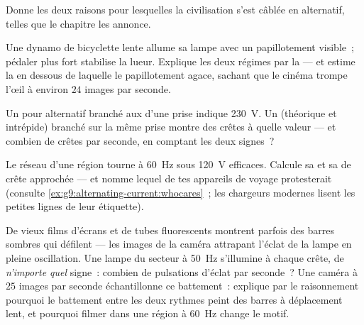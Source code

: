 \begin{exercise}[$\star$]\label{exo:g9:alternating-current:8}
Donne les deux raisons pour lesquelles la civilisation s'est câblée en
alternatif, telles que le chapitre les annonce.
\end{exercise}

\begin{exercise}[$\star\star$]\label{exo:g9:alternating-current:9}
Une dynamo de bicyclette lente allume sa lampe avec un papillotement
visible~; pédaler plus fort stabilise la lueur. Explique les deux
régimes par la  --- et estime la  en dessous de
laquelle le papillotement agace, sachant que le cinéma trompe l'œil à
environ $24$ images par seconde.
\end{exercise}

\begin{exercise}[$\star\star$]\label{exo:g9:alternating-current:10}
Un  pour alternatif branché aux  d'une prise indique
\qty{230}{V}. Un  (théorique et intrépide) branché sur la
même prise montre des crêtes à quelle valeur --- et combien de crêtes
par seconde, en comptant les deux signes~?
\end{exercise}

\begin{exercise}[$\star\star$]\label{exo:g9:alternating-current:11}
Le réseau d'une région tourne à \qty{60}{Hz} sous \qty{120}{V}
efficaces. Calcule sa  et sa  de crête approchée --- et
nomme lequel de tes appareils de voyage protesterait (consulte
\cref{ex:g9:alternating-current:whocares}~; les chargeurs modernes
lisent les petites lignes de leur étiquette).
\end{exercise}

\begin{exercise}[$\star\star\star$]\label{exo:g9:alternating-current:12}
De vieux films d'écrans et de tubes fluorescents montrent parfois des
barres sombres qui défilent --- les images de la caméra attrapant
l'éclat de la lampe en pleine oscillation. Une lampe du secteur à
\qty{50}{Hz} s'illumine à chaque crête, de \emph{n'importe quel}
signe~: combien de pulsations d'éclat par seconde~? Une caméra à $25$
images par seconde échantillonne ce battement~: explique par le
raisonnement pourquoi le battement entre les deux rythmes peint des
barres à déplacement lent, et pourquoi filmer dans une région à
\qty{60}{Hz} change le motif.
\end{exercise}

